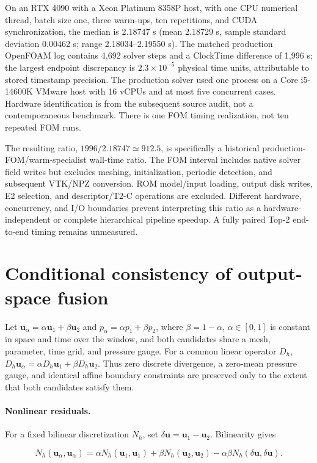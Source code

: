 \documentclass{article}
\providecommand{\DIFaddtex}[1]{{\protect\color{blue} \sf #1}} %
\providecommand{\DIFaddend}{} %
\providecommand{\DIFadd}[1]{\texorpdfstring{\DIFaddtex{#1}}{#1}} %
\begin{document}
\DIFadd{On an RTX 4090 with a Xeon Platinum 8358P host, with one CPU numerical
thread, batch size one, three warm-ups, ten repetitions, and CUDA
synchronization, the median is 2.18747 s (mean 2.18729 s, sample standard
deviation 0.00462 s; range 2.18034--2.19550 s). The matched production
OpenFOAM log contains 4,692 solver steps and a ClockTime difference of
1,996 s; the largest endpoint discrepancy is $2.3\times10^{-5}$ physical
time units, attributable to stored timestamp precision. The production
solver used one process on a Core i5-14600K VMware host with 16 vCPUs and
at most five concurrent cases. Hardware identification is from the
subsequent source audit, not a contemporaneous benchmark. There is one
FOM timing realization, not ten repeated FOM runs.
}

\DIFadd{The resulting ratio, $1996/2.18747\simeq912.5$, is specifically a historical
production-FOM/warm-specialist wall-time ratio. The FOM interval includes
native solver field writes but excludes meshing, initialization, periodic
detection, and subsequent VTK/NPZ conversion. ROM model/input loading,
output disk writes, E2 selection, and descriptor/T2-C operations are
excluded. Different hardware, concurrency, and I/O boundaries prevent
interpreting this ratio as a hardware-independent or complete hierarchical
pipeline speedup. A fully paired Top-2 end-to-end timing remains unmeasured.
}

\DIFaddend \section{Conditional consistency of output-space fusion}
\label{app:fusion_consistency}
Let $\bm u_\alpha=\alpha\bm u_1+\beta\bm u_2$ and $p_\alpha=\alpha p_1+\beta p_2$, where $\beta=1-\alpha$, $\alpha\in[0,1]$ is constant in space and time over the window, and both candidates share a mesh, parameter, time grid, and pressure gauge. For a common linear operator $D_h$, $D_h\bm u_\alpha=\alpha D_h\bm u_1+\beta D_h\bm u_2$. Thus zero discrete divergence, a zero-mean pressure gauge, and identical affine boundary constraints are preserved only to the extent that both candidates satisfy them.

\paragraph{Nonlinear residuals.}
For a fixed bilinear discretization $N_h$, set $\delta\bm u=\bm u_1-\bm u_2$. Bilinearity gives


\begin{equation}
N_h(\bm u_\alpha,\bm u_\alpha)
=\alpha N_h(\bm u_1,\bm u_1)+\beta N_h(\bm u_2,\bm u_2)
-\alpha\beta N_h(\delta\bm u,\delta\bm u).
\end{equation}
\end{document}

